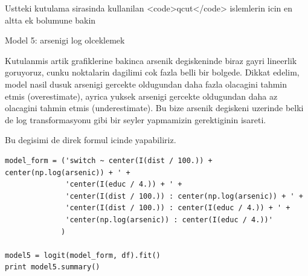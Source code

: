 \documentclass[12pt,fleqn]{article}\usepackage{../common}
\begin{document}
Ustteki kutulama sirasinda kullanilan <code>qcut</code> islemlerin
icin en altta ek bolumune bakin

Model 5: arsenigi log olceklemek

Kutulanmis artik grafiklerine bakinca arsenik degiskeninde biraz gayri
lineerlik goruyoruz, cunku noktalarin dagilimi cok fazla belli bir
bolgede. Dikkat edelim, model nasil dusuk arsenigi gercekte oldugundan
daha fazla olacagini tahmin etmis (overestimate), ayrica yuksek
arsenigi gercekte oldugundan daha az olacagini tahmin etmis
(underestimate). Bu bize arsenik degiskeni uzerinde belki de log
transformasyonu gibi bir seyler yapmamizin gerektiginin isareti.

Bu degisimi de direk formul icinde yapabiliriz.

\begin{verbatim}
model_form = ('switch ~ center(I(dist / 100.)) + center(np.log(arsenic)) + ' +
              'center(I(educ / 4.)) + ' +
              'center(I(dist / 100.)) : center(np.log(arsenic)) + ' + 
              'center(I(dist / 100.)) : center(I(educ / 4.)) + ' + 
              'center(np.log(arsenic)) : center(I(educ / 4.))'
             )

model5 = logit(model_form, df).fit()
print model5.summary()
\end{verbatim}
\end{document}
